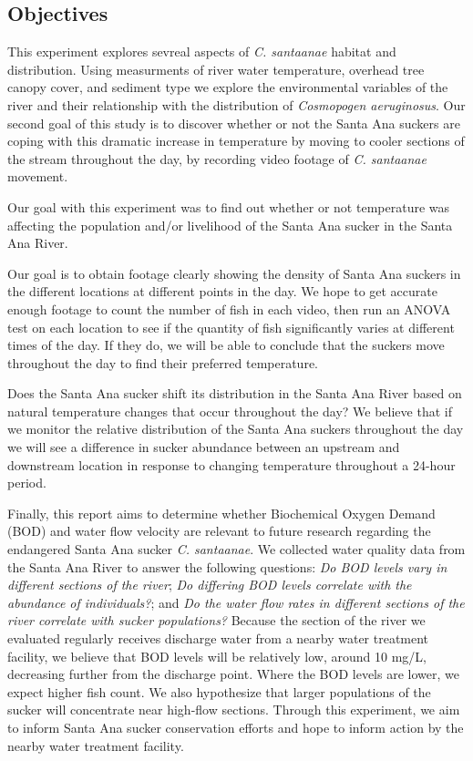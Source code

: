 \documentclass{article}
\begin{document}
\subsection{Objectives}
This experiment explores sevreal aspects of \emph{C. santaanae} habitat and distribution. Using measurments of river water temperature, overhead tree canopy cover, and sediment type we explore the environmental variables of the river and their relationship with the distribution of \emph{Cosmopogen aeruginosus}. Our second goal of this study is to discover whether or not the Santa Ana suckers are coping with this dramatic increase in temperature by moving to cooler sections of the stream throughout the day, by recording video footage of \emph{C. santaanae} movement. 

Our goal with this experiment was to find out whether or not temperature was affecting the population and/or livelihood of the Santa Ana sucker in the Santa Ana River.

Our goal is to obtain footage clearly showing the density of Santa Ana suckers in the different locations at different points in the day.  We hope to get accurate enough footage to count the number of fish in each video, then run an ANOVA test on each location to see if the quantity of fish significantly varies at different times of the day.  If they do, we will be able to conclude that the suckers move throughout the day to find their preferred temperature.

Does the Santa Ana sucker shift its distribution in the Santa Ana River based on natural temperature changes that occur throughout the day? We believe that if we monitor the relative distribution of the Santa Ana suckers throughout the day we will see a difference in sucker abundance between an upstream and downstream location in response to changing temperature throughout a 24-hour period.

Finally, this report aims to determine whether Biochemical Oxygen Demand (BOD) and water flow velocity are relevant to future research regarding the endangered Santa Ana sucker \emph{C. santaanae}. We collected water quality data from the Santa Ana River to answer the following questions: \emph{Do BOD levels vary in different sections of the river}; \emph{Do differing BOD levels correlate with the abundance of individuals?}; and \emph{Do the water flow rates in different sections of the river correlate with sucker populations?} Because the section of the river we evaluated regularly receives discharge water from a nearby water treatment facility, we believe that BOD levels will be relatively low, around 10 mg/L, decreasing further from the discharge point. Where the BOD levels are lower, we expect higher fish count. We also hypothesize that larger populations of the sucker will concentrate near high-flow sections. Through this experiment, we aim to inform Santa Ana sucker conservation efforts and hope to inform action by the nearby water treatment facility. 
\end{document}
